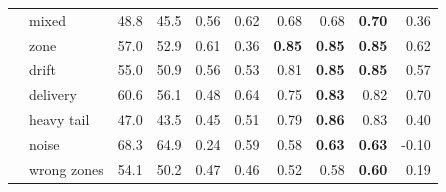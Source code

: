 \begin{tabular}{llrrrrrrrr}
 & mixed & 48.8 & 45.5 & 0.56 & 0.62 & 0.68 & 0.68 & \textbf{0.70} & 0.36 \\
 & zone & 57.0 & 52.9 & 0.61 & 0.36 & \textbf{0.85} & \textbf{0.85} & \textbf{0.85} & 0.62 \\
 & drift & 55.0 & 50.9 & 0.56 & 0.53 & 0.81 & \textbf{0.85} & \textbf{0.85} & 0.57 \\
 & delivery & 60.6 & 56.1 & 0.48 & 0.64 & 0.75 & \textbf{0.83} & 0.82 & 0.70 \\
 & heavy tail & 47.0 & 43.5 & 0.45 & 0.51 & 0.79 & \textbf{0.86} & 0.83 & 0.40 \\
 & noise & 68.3 & 64.9 & 0.24 & 0.59 & 0.58 & \textbf{0.63} & \textbf{0.63} & -0.10 \\
 & wrong zones & 54.1 & 50.2 & 0.47 & 0.46 & 0.52 & 0.58 & \textbf{0.60} & 0.19 \\
\bottomrule
\end{tabular}
